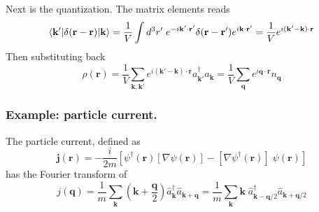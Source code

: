 \documentclass[../../../main.tex]{subfiles}
\begin{document}
Next is the quantization.
The matrix elements reads
\begin{equation*}
  \braket{\mathbf{k }' | \delta(\mathbf{r }-\mathbf{r }) |\mathbf{k}}
  =\frac{1}{V}\int d^3r'\; e^{-i\mathbf{k}'\cdot\mathbf{r}'}\delta(\mathbf{r}-\mathbf{r}')e^{i\mathbf{k}\cdot\mathbf{r}'} = \frac{1 }{V } e ^{i(\mathbf{k }'-\mathbf{k  })\cdot \mathbf{r}}
\end{equation*}
Then  substituting back
\begin{equation*}
  \rho(\mathbf{r})
  = \frac{1 }{V } \sum_{\mathbf{k},\mathbf{k}'}  e ^{i(\mathbf{k }'-\mathbf{k  })\cdot \mathbf{r}} a ^\dagger _{\mathbf{k }' } a_{\mathbf{k}}
  =\frac{1 }{V }\sum_{\mathbf{q }} e ^{i \mathbf{q }\cdot \mathbf{r }}n _{\mathbf{q}}
\end{equation*}

\subsubsection{Example: particle current.}
The particle current, defined as
\begin{equation*}
  \mathbf{j}(\mathbf{r}) = -\frac{i}{2m}\left[\psi^\dagger(\mathbf{r})[\nabla\psi(\mathbf{r})] - [\nabla\psi^\dagger(\mathbf{r})]\;\psi(\mathbf{r})\right]
\end{equation*}
has the Fourier transform of
\begin{equation*}
  j(\mathbf{q})
  = \frac{1}{m}\sum_{\mathbf{k}} \left( \mathbf{k}+\frac{\mathbf{q } }{2} \right)  \hat{a}_{\mathbf{k}}^\dagger \hat{a}_{\mathbf{k}+\mathbf{q}}
  = \frac{1}{m}\sum_{\mathbf{k}} \mathbf{k}\; \hat{a}_{\mathbf{k}-\mathbf{q}/2}^\dagger \hat{a}_{\mathbf{k}+\mathbf{q}/2}
\end{equation*}
\end{document}
